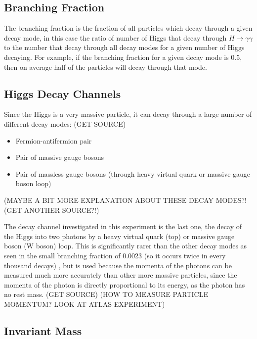 \documentclass[11pt]{amsart}
\begin{document}
\begin{multicols}{2}
\subsection{Branching Fraction}
\label{sec:branching}

The branching fraction is the fraction of all particles which decay through a given decay mode, in this case the ratio of number of Higgs that decay through $H \to \gamma\gamma$ to the number that decay through all decay modes for a given number of Higgs decaying. For example, if the branching fraction for a given decay mode is $0.5$, then on average half of the particles will decay through that mode.

\subsection{Higgs Decay Channels}

Since the Higgs is a very massive particle, it can decay through a large number of different decay modes: (GET SOURCE)

\begin{itemize}
    \item Fermion-antifermion pair
    \item Pair of massive gauge bosons
    \item Pair of massless gauge bosons (through heavy virtual quark or massive gauge boson loop)
\end{itemize}

\cite{decaymodes1} \cite{decaymodes2}

(MAYBE A BIT MORE EXPLANATION ABOUT THESE DECAY MODES?! (GET ANOTHER SOURCE?!)

The decay channel investigated in this experiment is the last one, the decay of the Higgs into two photons by a heavy virtual quark (top) or massive gauge boson (W boson) loop. This is significantly rarer than the other decay modes as seen in the small branching fraction of 0.0023 (so it occurs twice in every thousand decays) \cite{HiggsCross1}, but is used because the momenta of the photons can be measured much more accurately than other more massive particles, since the momenta of the photon is directly proportional to its energy, as the photon has no rest mass. (GET SOURCE) (HOW TO MEASURE PARTICLE MOMENTUM? LOOK AT ATLAS EXPERIMENT)

\subsection{Invariant Mass}
\label{sec:invariant}


\end{multicols}
\end{document}
